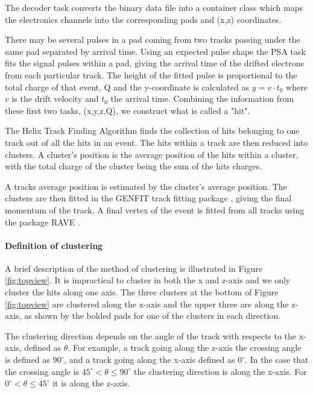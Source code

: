 \documentclass[review]{elsarticle}
\begin{document}
The decoder task converts the binary data file into a container class which maps the electronics channels into the corresponding pads and (x,z) coordinates. 

There may be several pulses in a pad coming from two tracks passing under the same pad separated  by arrival time. Using an expected pulse shape the PSA task fits the signal pulses within a pad, giving the arrival time of the drifted electrons from each particular track. The height of the fitted pulse is proportional to the total charge of that event, Q and the y-coordinate is calculated as $y = v\cdot t_0$ where $v$ is the drift velocity and $t_0$ the arrival time. Combining the information from these first two tasks, (x,y,z,Q), we construct what is called a "hit". 

 The Helix Track Finding Algorithm finds the collection of hits belonging to one track out of all the hits in an event. The hits within a track are then reduced into clusters. A cluster's position is the average position of the hits within a cluster, with the total charge of the cluster being the sum of the hits charges. 
 
 A tracks average position is estimated by the cluster's average position. The clusters are then fitted in the GENFIT track fitting package \cite{genfit}, giving the final momentum of the track. A final vertex of the event is fitted from all tracks using the package RAVE \cite{rave}. 
 

\paragraph{Definition of clustering}

A brief description of the method of clustering is illustrated in Figure \ref{fig:topview}. It is impractical to cluster in both the x and z-axis and we only cluster the hits along one axis. The three clusters at the bottom of Figure \ref{fig:topview} are clustered along the x-axis and the upper three are along the z-axis, as shown by the bolded pads for one of the clusters in each direction.

 The clustering direction depends on the angle  of the track with respects to the x-axis, defined as $\theta$. For example, a track going along the z-axis the crossing angle is defined as $90^{\circ}$, and a track going along the x-axis defined as $0^{\circ}$. In the case that the crossing angle is $45^{\circ} < \theta \leq 90^{\circ} $ the clustering direction is along the x-axis. For $0^{\circ} < \theta \leq 45^{\circ}$ it is along the z-axis. 
\end{document}
